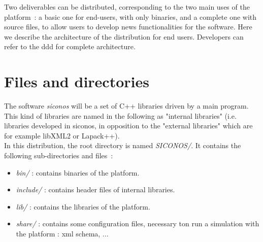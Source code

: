 Two deliverables can be distributed, corresponding to the two main uses of the platform~: a basic one for end-users, with only binaries, and a complete one with source files, to allow users to develop news functionalities for the software.
Here we describe the architecture of the distribution for end users. Developers can refer to the \ac{ddd} for complete architecture.

\section{Files and directories}
The software \textit{siconos} will be a set of C++ libraries driven by a main program. This kind of libraries are named in the following as "internal libraries" (i.e. libraries developed in \ac{siconos}, in opposition to the "external libraries" which are for example libXML2 or Lapack++). \\

In this distribution, the root directory is named \textit{SICONOS/}. It contains the following sub-directories and files~: 
\begin{itemize}

\item  \textit{bin/} : contains binaries of the platform.

\item \textit{include/} : contains header files of internal libraries.

\item \textit{lib/} : contains the libraries of the platform.

\item \textit{share/} : contains some configuration files, necessary ton run a simulation with the platform : \acs{xml} schema, ...

\end{itemize}


